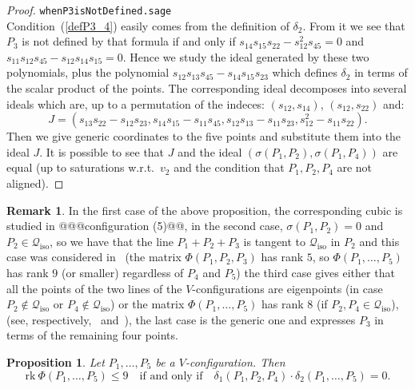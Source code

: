 \documentclass{amsart}
\theoremstyle{plain}
\newtheorem{prop}[lemma]{Proposition}
\theoremstyle{definition}
\newtheorem{rmk}[lemma]{Remark}
\newcommand{\iso}{\mathcal{Q}_{\mathrm{iso}}}
\newcommand{\rk}{\ensuremath{\mathrm{rk}}}
\begin{document}
%
\begin{proof}
\verb+whenP3isNotDefined.sage+\\
Condition~(\ref{defP3_4}) easily comes from the definition of $\delta_2$.
From it we see that $P_3$ is not defined by that formula if and only if
$s_{14}s_{15}s_{22}-s_{12}^2s_{45}=0$ and $s_{11}s_{12}s_{45}-s_{12}s_{14}s_{15}=0$.
Hence we study the ideal generated by these two polynomials, plus the
polynomial $s_{12}s_{13}s_{45}-s_{14}s_{15} s_{23}$ which defines
$\delta_2$ in terms of the scalar product of the points. The corresponding
ideal decomposes into several ideals which are, up to a permutation of
the indeces: $(s_{12}, s_{14})$, $(s_{12}, s_{22})$ and:
\[
J = (s_{13}s_{22} - s_{12}s_{23}, s_{14}s_{15} - s_{11}s_{45}, s_{12}s_{13} -
s_{11}s_{23}, s_{12}^2 - s_{11}s_{22}).
\]
Then we give generic coordinates to the five
points and substitute them into the ideal $J$. It is possible to see that
$J$ and the ideal $(\sigma(P_1, P_2), \sigma(P_1, P_4))$ are equal (up to
saturations w.r.t.\ $v_2$ and the condition that $P_1, P_2, P_4$ are not
aligned).
\end{proof}
%
\begin{rmk}
In the first case of the above proposition, the corresponding cubic
is studied in @@@configuration (5)@@, in the
second case, $\sigma(P_1, P_2) = 0$ and $P_2\in \iso$, so
we have that the line $P_1+P_2+P_3$ is tangent to $\iso$ in $P_2$
and this case was considered in~
(the matrix $\Phi(P_1, P_2, P_3)$ has rank $5$, so
$\Phi(P_1, \dots, P_5)$ has rank $9$ (or smaller) regardless of
$P_4$ and $P_5$)
the third case gives either that all the
points of the two lines of the $V$-configurations are eigenpoints (in case
$P_2 \not\in \iso$ or $P_4 \not\in \iso$) or the matrix $\Phi(P_1, \dots, P_5)$
has rank $8$ (if $P_2, P_4 \in \iso$), (see, respectively,~
and~),
the last case is the generic one and expresses $P_3$ in terms of the remaining
four points.
\end{rmk}
%
\begin{prop}
\label{prop:d1d2}
Let $P_1, \dots, P_5$ be a $V$-configuration. Then
\[
\rk \ \Phi(P_1, \dots, P_5) \leq 9
\quad \mbox{
if and only if} \quad
\delta_1(P_1, P_2, P_4) \cdot \delta_2(P_1, \dots, P_5) = 0.
\]
\end{prop}
\end{document}
